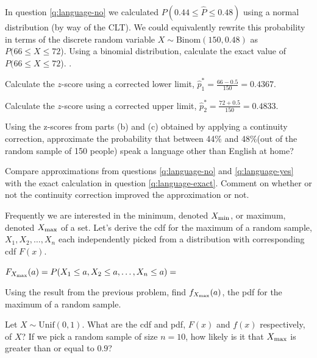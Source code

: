 \bb[resume]
\ii In question \ref{q:language-no} we calculated $P\left( 0.44  \leq \widehat{P} \leq 0.48 \right)$ using a normal distribution (by way of the CLT). We could equivalently rewrite this probability in terms of the discrete random variable $X \sim \mbox{Binom}(150,0.48)$ as $P( 66 \leq X \leq 72$).
\bb
\ii Using a binomial distribution, calculate the exact value of $P( 66 \leq X \leq 72$). \label{q:language-exact}. \vfill

\ii Calculate the $z$-score using a corrected lower limit, $\hat{p}_1^* = \frac{66-0.5}{150} = 0.4367$.  \vfill

\ii Calculate the $z$-score using a corrected upper limit, $\hat{p}_2^* = \frac{72+0.5}{150} = 0.4833$.  \vfill

\ii Using the z-scores from parts (b) and (c) obtained by applying a continuity correction, approximate the probability that between 44\% and 48\%(out of the random sample of 150 people) speak a language other than English at home? \label{q:language-yes}  \vfill

\ii Compare approximations from questions \ref{q:language-no} and \ref{q:language-yes} with the exact calculation in question \ref{q:language-exact}. Comment on whether or not the continuity correction improved the approximation or not.  \vfill
\ee
\ee

\clearpage


\bb[resume]
\ii Frequently we are interested in the minimum, denoted $X_{\rm{min}}$, or maximum, denoted $X_{\rm{max}}$ of a set.  Let’s derive the cdf for the maximum of a random sample, $X_1,X_2, \ldots, X_n$ each independently picked from a distribution with  corresponding cdf $F(x)$. \medskip

$\displaystyle F_{X_{\rm{max}}} (a) = P(X_1 \leq a, X_2 \leq a, \ldots, X_n \leq a) = $
\vfill

\ii Using the result from the previous problem, find $\displaystyle f_{X_{\rm{max}}} (a)$, the pdf for the maximum of a random sample. \vspace{1in}

\ii Let $X \sim \mbox{Unif}(0,1)$.
\bb
\ii What are the cdf and pdf, $F(x)$ and $f(x)$ respectively, of $X$? \vspace{1in}
\ii If we pick a random sample of size $n=10$, how likely is it that $X_{\rm{max}}$ is greater than or equal to $0.9$? \vspace{2in}
\ee
\ee


